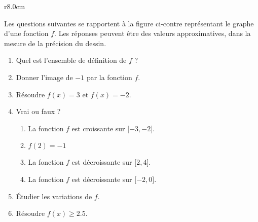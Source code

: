 
\begin{exercice}\label{exosmath-0449}

    \begin{wrapfigure}{r}{8.0cm}
        \vspace{-0.5cm}
        \centering
        
    \end{wrapfigure}

    Les questions suivantes se rapportent à la figure ci-contre représentant le graphe d'une fonction \( f\). Les réponses peuvent être des valeurs approximatives, dans la mesure de la précision du dessin.
    \begin{enumerate}
        \item
            Quel est l'ensemble de définition de \( f\) ?
        \item
            Donner l'image de \( -1\) par la fonction \( f\).
        \item
            Résoudre \( f(x)=3\) et \( f(x)=-2\).
        \item
            Vrai ou faux ?
            \begin{enumerate}
                \item
                    La fonction \( f\) est croissante sur \( \mathopen[ -3 , -2 \mathclose]\).
                \item
                    \( f(2)=-1\)
                \item
                    La fonction \( f\) est décroissante sur \( \mathopen[ 2 , 4 \mathclose]\).
                \item
                    La fonction \( f\) est décroissante sur \( \mathopen[ -2 , 0 \mathclose]\).
            \end{enumerate}
        \item
            Étudier les variations de \( f\).
        \item
            Résoudre \( f(x)\geq 2.5\).
    \end{enumerate}

\end{exercice}
